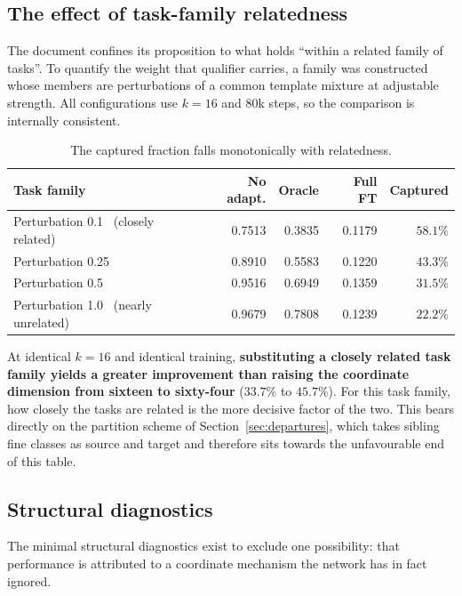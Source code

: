 \documentclass[11pt]{article}
\begin{document}
\subsection{The effect of task-family relatedness}

The document confines its proposition to what holds ``within a related family of tasks''. To
quantify the weight that qualifier carries, a family was constructed whose members are perturbations
of a common template mixture at adjustable strength. All configurations use $k=16$ and 80k steps, so
the comparison is internally consistent.

\begin{table}[htbp]
\centering\small
\begin{tabular}{@{}lrrrr@{}}
\toprule
\textbf{Task family} & No adapt. & Oracle & Full FT & \textbf{Captured} \\
\midrule
Perturbation 0.1 \ (closely related)   & 0.7513 & 0.3835 & 0.1179 & $\mathbf{58.1\%}$ \\
Perturbation 0.25                      & 0.8910 & 0.5583 & 0.1220 & $43.3\%$ \\
Perturbation 0.5                       & 0.9516 & 0.6949 & 0.1359 & $31.5\%$ \\
Perturbation 1.0 \ (nearly unrelated)  & 0.9679 & 0.7808 & 0.1239 & $22.2\%$ \\
\bottomrule
\end{tabular}
\caption{The captured fraction falls monotonically with relatedness.}
\label{tab:related}
\end{table}

At identical $k=16$ and identical training, \textbf{substituting a closely related task family
yields a greater improvement than raising the coordinate dimension from sixteen to sixty-four}
($33.7\%$ to $45.7\%$). For this task family, how closely the tasks are related is the more decisive
factor of the two. This bears directly on the partition scheme of Section~\ref{sec:departures},
which takes sibling fine classes as source and target and therefore sits towards the unfavourable
end of this table.

\subsection{Structural diagnostics}

The minimal structural diagnostics exist to exclude one possibility: that performance is attributed
to a coordinate mechanism the network has in fact ignored.
\end{document}
